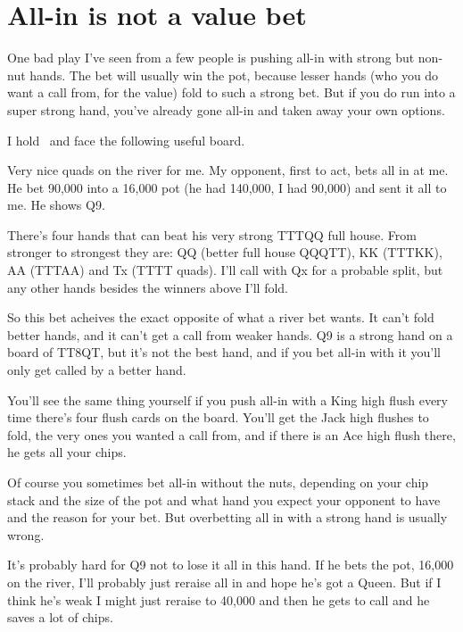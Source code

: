 \chapter{All-in is not a value bet}



One bad play I've seen from a few people is pushing all-in
with strong but non-nut hands. The bet will usually win the
pot, because lesser hands (who you do want a call from, for the
value) fold to such a strong bet. But if you do run
into a super strong hand, you've already gone all-in and taken
away your own options.

I hold \Jh\tens\ and face the following useful board.

\begin{cards}
\crdtenh\crdtenc\crdeigh\crdQd\crdtend%
\end{cards}

Very nice quads on the river for me. My opponent, first to act, bets all in
at me. He bet 90,000 into a 16,000 pot (he had 140,000, I had 90,000) and
sent it all to me. He shows Q9.

There's four hands that can beat his very strong TTTQQ full house.
From stronger to strongest they are: QQ (better full house QQQTT),
KK (TTTKK), AA (TTTAA) and Tx (TTTT quads).
I'll call with Qx for a probable split, but any
other hands besides the winners above I'll fold.

So this bet acheives the exact opposite of what a river bet wants.
It can't fold better hands, and it can't get a call from weaker hands.
Q9 is a strong hand on a board of TT8QT, but it's not the best hand,
and if you bet all-in with it you'll only get called by a better hand.

You'll see the same thing yourself if you push all-in with a King
high flush every time there's four flush cards on the board.
You'll get the Jack high flushes to fold, the very ones you
wanted a call from, and if there is an Ace high flush there,
he gets all your chips.

Of course you sometimes bet all-in without the nuts, depending on
your chip stack and the size of the pot and what hand you expect
your opponent to have and the reason for your bet. But overbetting
all in with a strong hand is usually wrong.

It's probably hard for Q9 not to lose it all in this hand. If he bets
the pot, 16,000 on the river, I'll probably just reraise all in and hope
he's got a Queen. But if I think he's weak I might just reraise to 40,000
and then he gets to call and he saves a lot of chips.
